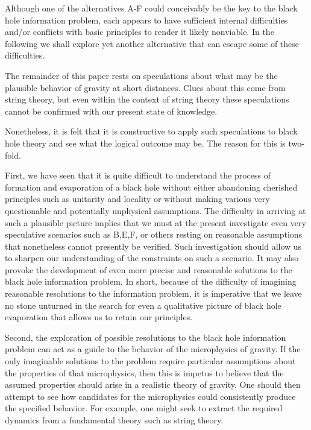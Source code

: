 Although one of the alternatives A-F could conceivably be the key to
the black hole information problem, each appears to have sufficient
internal difficulties and/or conflicts with basic principles to render it
likely nonviable.  In the following we shall explore yet another
alternative that can escape some of these difficulties.
%
%
%

\itemskip
The remainder of this paper rests on speculations about
what may be the plausible behavior of gravity at short
distances.  Clues about this come from string theory, but even within the
context of string theory these speculations cannot be confirmed with our
present state of knowledge.

Nonetheless, it is felt that it is constructive to apply such
speculations to black hole theory and see what the logical outcome may be.
The reason for this is two-fold.

First,
we have seen that it is quite difficult to understand the process of
formation and evaporation of a black hole without either abandoning
cherished principles such as unitarity and locality or without
making various very
questionable and potentially unphysical assumptions.
The difficulty in arriving at such a plausible picture implies that
we must at the present investigate even very
speculative scenarios such as B,E,F, or others resting on
reasonable assumptions that nonetheless cannot presently be verified.
Such investigation should allow us to sharpen our
understanding of the constraints on such a scenario.  It may also
provoke the development of even more precise and reasonable
solutions to the black hole information problem.
In short, because of the difficulty of imagining reasonable resolutions to
the information problem, it is
imperative that we leave no stone unturned in the search for
even a qualitative
picture of black hole evaporation that allows us to retain our principles.

Second, the exploration of possible resolutions to the black hole
information problem can act as a guide to the behavior of the
microphysics of gravity.  If the only imaginable solutions to the problem
require particular
assumptions about the properties of that microphysics, then this is
impetus to believe that the assumed properties should arise in a
realistic theory of gravity.
One should then attempt
to see how candidates for the  microphysics could consistently
produce the specified behavior.
For example, one might seek to extract the required dynamics
from a fundamental theory such as string theory.

